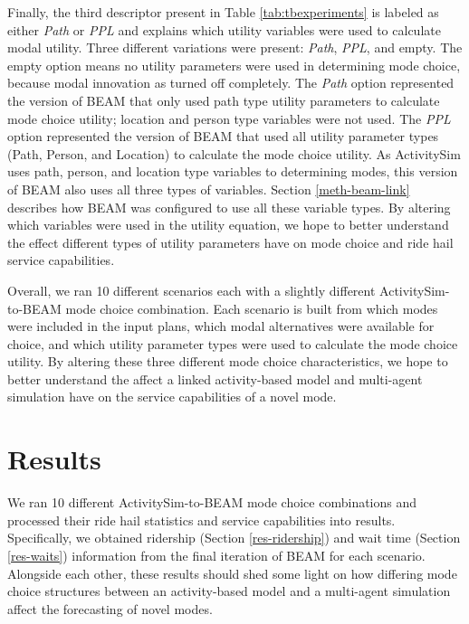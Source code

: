 \documentclass[fancy, masters]{byuthesis}
\begin{document}
Finally, the third descriptor present in Table \ref{tab:tbexperiments} is labeled as either \emph{Path} or \emph{PPL} and explains which utility variables were used to calculate modal utility. Three different variations were present: \emph{Path}, \emph{PPL}, and empty. The empty option means no utility parameters were used in determining mode choice, because modal innovation as turned off completely. The \emph{Path} option represented the version of BEAM that only used path type utility parameters to calculate mode choice utility; location and person type variables were not used. The \emph{PPL} option represented the version of BEAM that used all utility parameter types (Path, Person, and Location) to calculate the mode choice utility. As ActivitySim uses path, person, and location type variables to determining modes, this version of BEAM also uses all three types of variables. Section \ref{meth-beam-link} describes how BEAM was configured to use all these variable types. By altering which variables were used in the utility equation, we hope to better understand the effect different types of utility parameters have on mode choice and ride hail service capabilities.

Overall, we ran 10 different scenarios each with a slightly different ActivitySim-to-BEAM mode choice combination. Each scenario is built from which modes were included in the input plans, which modal alternatives were available for choice, and which utility parameter types were used to calculate the mode choice utility. By altering these three different mode choice characteristics, we hope to better understand the affect a linked activity-based model and multi-agent simulation have on the service capabilities of a novel mode.

\hypertarget{results}{%
\chapter{Results}\label{results}}

We ran 10 different ActivitySim-to-BEAM mode choice combinations and processed their ride hail statistics and service capabilities into results. Specifically, we obtained ridership (Section \ref{res-ridership}) and wait time (Section \ref{res-waits}) information from the final iteration of BEAM for each scenario. Alongside each other, these results should shed some light on how differing mode choice structures between an activity-based model and a multi-agent simulation affect the forecasting of novel modes.
\end{document}
